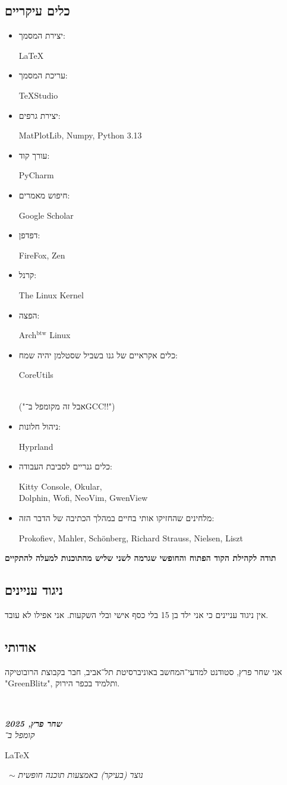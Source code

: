 \documentclass[]{article}
\newcommand\en[1] {\begin{otherlanguage}{english}#1\end{otherlanguage}}
\newcommand\ndoc  {\dotfill \\ \vfil {\begin{center}
			{\textbf{\textit{שחר פרץ, 2025}} \\
				\scriptsize \textit{קומפל ב־}\en{\LaTeX}\, $\sim$ \textit{ נוצר (בעיקר) באמצעות תוכנה חופשית }}
	\end{center}} \vfil	}
\theoremstyle{definition}
\begin{document}
	\subsection{כלים עיקריים}
	\begin{multicols}{2}
		\begin{itemize}
			\item יצירת המסמך: \hfill \en{\LaTeX}
			\item עריכת המסמך: \hfill \en{\TeX Studio}
			\item יצירת גרפים: \hfill \en{MatPlotLib, Numpy, Python 3.13}
			\item עורך קוד: \hfill \en{PyCharm}
			\item חיפוש מאמרים: \hfill \en{Google Scholar}
			\item דפדפן: \hfill \en{FireFox, Zen}
			\item קרנל: \hfill \en{The Linux Kernel}
			\item הפצה: \hfill \en{Arch$^{\text{btw}}$ Linux}
			\item כלים אקראיים של גנו בשביל שסטלמן יהיה שמח: \hfill \en{CoreUtils} \\
			("אבל זה מקומפל ב־GCC!!")
			\item ניהול חלונות: \hfill \en{Hyprland}
			\item כלים גנריים לסביבת העבודה: \hfill \en{Kitty Console, Okular, \\ Dolphin, Wofi, NeoVim, GwenView \hfill}
			\item מלחינים שהחזיקו אותי בחיים במהלך הכתיבה של הדבר הזה: \hfill \en{Prokofiev, Mahler, Schönberg, Richard Strauss, Nielsen, Liszt \hfill}
		\end{itemize}
	\end{multicols}
	
	\hfil \textbf{תודה לקהילת הקוד הפתוח והחופשי שגרמה לשני שליש מהתוכנות למעלה להתקיים}
	
	\subsection{ניגוד עניינים}
	אין ניגוד עניינים כי אני ילד בן 15 בלי כסף אישי ובלי השקעות. אני אפילו לא עובד. 
	
	\subsection{אודותי}
	אני שחר פרץ, סטודנט למדעי־המחשב באוניברסיטת תל־אביב, חבר בקבוצת הרובוטיקה "GreenBlitz", ותלמיד בכפר הירוק. 
	
	
	
	\ndoc
\end{document}
